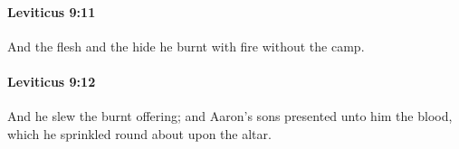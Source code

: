 		\paragraph{Leviticus 9:11} %
			\label{LEVITICUS-9-11}

			And the flesh and the hide he burnt with fire without the camp.


		\paragraph{Leviticus 9:12} %
			\label{LEVITICUS-9-12}

			And he slew the burnt offering; and Aaron’s sons presented unto him the blood, which he sprinkled round about upon the altar.


